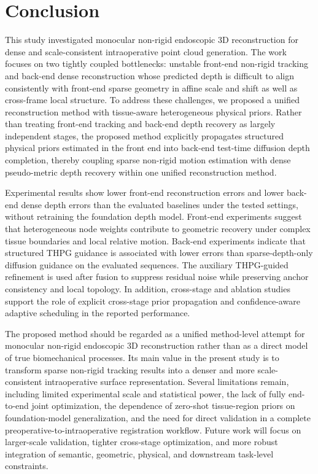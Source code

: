 \documentclass[pdflatex,sn-mathphys-num]{sn-jnl}
\begin{document}
\section{Conclusion}\label{sec:conclusion}

This study investigated monocular non-rigid endoscopic 3D reconstruction for dense and scale-consistent intraoperative point cloud generation. The work focuses on two tightly coupled bottlenecks: unstable front-end non-rigid tracking and back-end dense reconstruction whose predicted depth is difficult to align consistently with front-end sparse geometry in affine scale and shift as well as cross-frame local structure. To address these challenges, we proposed a unified reconstruction method with tissue-aware heterogeneous physical priors. Rather than treating front-end tracking and back-end depth recovery as largely independent stages, the proposed method explicitly propagates structured physical priors estimated in the front end into back-end test-time diffusion depth completion, thereby coupling sparse non-rigid motion estimation with dense pseudo-metric depth recovery within one unified reconstruction method.

Experimental results show lower front-end reconstruction errors and lower back-end dense depth errors than the evaluated baselines under the tested settings, without retraining the foundation depth model. Front-end experiments suggest that heterogeneous node weights contribute to geometric recovery under complex tissue boundaries and local relative motion. Back-end experiments indicate that structured THPG guidance is associated with lower errors than sparse-depth-only diffusion guidance on the evaluated sequences. The auxiliary THPG-guided refinement is used after fusion to suppress residual noise while preserving anchor consistency and local topology. In addition, cross-stage and ablation studies support the role of explicit cross-stage prior propagation and confidence-aware adaptive scheduling in the reported performance.

The proposed method should be regarded as a unified method-level attempt for monocular non-rigid endoscopic 3D reconstruction rather than as a direct model of true biomechanical processes. Its main value in the present study is to transform sparse non-rigid tracking results into a denser and more scale-consistent intraoperative surface representation. Several limitations remain, including limited experimental scale and statistical power, the lack of fully end-to-end joint optimization, the dependence of zero-shot tissue-region priors on foundation-model generalization, and the need for direct validation in a complete preoperative-to-intraoperative registration workflow. Future work will focus on larger-scale validation, tighter cross-stage optimization, and more robust integration of semantic, geometric, physical, and downstream task-level constraints.
\end{document}

